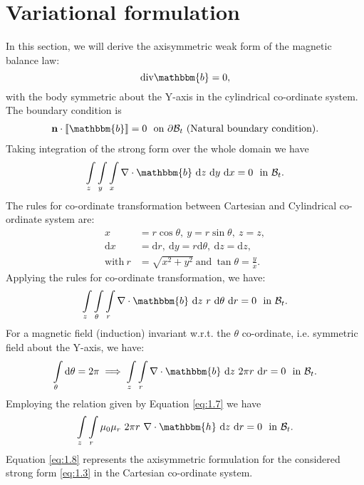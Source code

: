 \section{Variational formulation}
In this section, we will derive the axisymmetric weak form of the magnetic balance law:
\begin{equation}
 \text{div}\mathbbm{b} = 0,
 \end{equation} 
with the body symmetric about the Y-axis in the cylindrical co-ordinate system. The boundary condition is
\begin{align}
\mathbf{n} \cdot \llbracket \mathbbm{b} \rrbracket = 0 \ \ \text{on} \ \partial\mathcal{B}_t \ (\text{Natural boundary condition}).
\label{eq:1.10}
\end{align}
Taking integration of the strong form over the whole domain we have 
\begin{equation}
\int\limits_{z} \int\limits_{y} \int\limits_{x} \nabla \cdot \mathbbm{b} \ \mathrm{d}z \ \mathrm{d}y \ \mathrm{d}x = 0 \ \ \text{in} \ \mathcal{B}_t. 
\end{equation}
The rules for co-ordinate transformation between Cartesian and Cylindrical co-ordinate system are:
\begin{align}
x &= r \cos \theta, \ y = r \sin \theta, \ z = z, \nonumber\\
\mathrm{d}x &= \mathrm{d}r, \ \mathrm{d}y = r \mathrm{d}\theta, \ \mathrm{d}z = \mathrm{d}z, \nonumber\\
\text{with} \ r &= \sqrt{x^2 + y^2} \ \text{and} \ \tan \theta = \frac{y}{x}.
\end{align}
Applying the rules for co-ordinate transformation, we have:
\begin{equation}
\int\limits_{z} \int\limits_{\theta} \int\limits_{r} \nabla \cdot \mathbbm{b} \ \mathrm{d}z \ r \ \mathrm{d}\theta \ \mathrm{d}r = 0 \ \ \text{in} \ \mathcal{B}_t.
\end{equation}
For a magnetic field (induction) invariant w.r.t. the $\theta$ co-ordinate, i.e. symmetric field about the Y-axis, we have:
\begin{align}
\int\limits_{\theta} \mathrm{d}\theta = 2 \pi \implies \int\limits_{z} \int\limits_{r} \nabla \cdot \mathbbm{b} \ \mathrm{d}z \ 2 \pi r \ \mathrm{d}r = 0 \ \ \text{in} \ \mathcal{B}_t.
\label{eq:1.6}
\end{align}
Employing the relation given by Equation \eqref{eq:1.7} we have
\begin{equation}
\int\limits_{z} \int\limits_{r} \mu_0 \mu_r \ 2 \pi r \ \nabla \cdot \mathbbm{h} \ \mathrm{d}z \ \mathrm{d}r = 0 \ \ \text{in} \ \mathcal{B}_t.
\label{eq:1.8}
\end{equation}
Equation \eqref{eq:1.8} represents the axisymmetric formulation for the considered strong form \eqref{eq:1.3} in the Cartesian co-ordinate system. \par 

